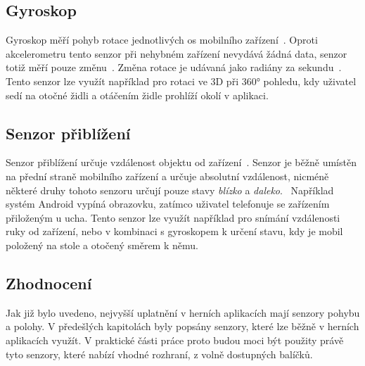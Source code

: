 \subsection{Gyroskop}

Gyroskop měří pohyb rotace jednotlivých os mobilního
zařízení~\cite{sensors_motion}.
Oproti akcelerometru tento senzor při nehybném zařízení
nevydává žádná data,
senzor totiž měří pouze změnu~\cite{sensors_motion}.
Změna rotace je udávaná jako radiány za sekundu~\cite{sensors_motion}.
Tento senzor lze využít například pro rotaci ve 3D při 360° pohledu,
kdy uživatel sedí na otočné židli a otáčením židle prohlíží okolí v aplikaci.

\subsection{Senzor přiblížení}

Senzor přiblížení určuje vzdálenost objektu od zařízení~\cite{sensors_position}.
Senzor je běžně umístěn na přední straně mobilního zařízení
a určuje absolutní vzdálenost,
nicméně některé druhy tohoto senzoru určují pouze
stavy \emph{blízko} a \emph{daleko}.~\cite{sensors_position}
Například systém Android vypíná obrazovku,
zatímco uživatel telefonuje se zařízením přiloženým u ucha.
Tento senzor lze využít například pro snímání vzdálenosti ruky od zařízení,
nebo v kombinaci s gyroskopem k určení stavu,
kdy je mobil položený na stole a otočený směrem k němu.

\subsection{Zhodnocení}

Jak již bylo uvedeno,
nejvyšší uplatnění v herních aplikacích mají senzory pohybu a polohy.
V předešlých kapitolách byly popsány senzory,
které lze běžně v herních aplikacích využít.
V praktické části práce proto budou moci být použity právě tyto senzory,
které nabízí vhodné rozhraní,
z volně dostupných balíčků.

